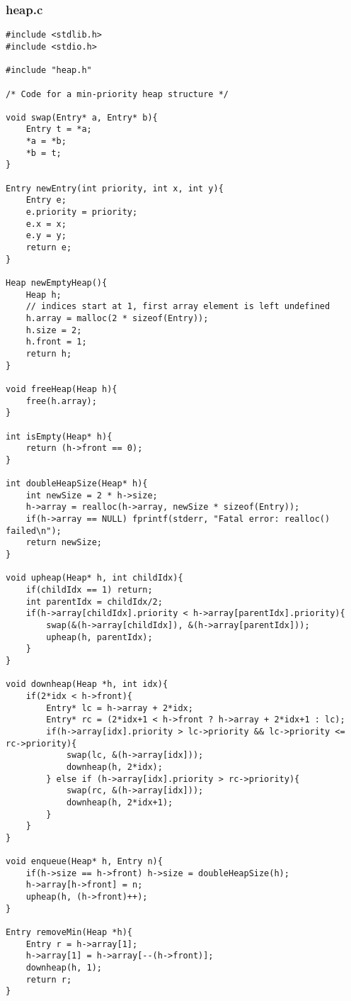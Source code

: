 \documentclass{article}
\begin{document}
\subsubsection*{heap.c}
\begin{lstlisting}
#include <stdlib.h>
#include <stdio.h>

#include "heap.h"

/* Code for a min-priority heap structure */

void swap(Entry* a, Entry* b){
	Entry t = *a;
	*a = *b;
	*b = t;
}

Entry newEntry(int priority, int x, int y){
	Entry e;
	e.priority = priority;
	e.x = x;
	e.y = y;
	return e;
}

Heap newEmptyHeap(){
	Heap h;
	// indices start at 1, first array element is left undefined
	h.array = malloc(2 * sizeof(Entry));
	h.size = 2;
	h.front = 1;
	return h;
}

void freeHeap(Heap h){
	free(h.array);
}

int isEmpty(Heap* h){
	return (h->front == 0);
}

int doubleHeapSize(Heap* h){
	int newSize = 2 * h->size;
	h->array = realloc(h->array, newSize * sizeof(Entry));
	if(h->array == NULL) fprintf(stderr, "Fatal error: realloc() failed\n");
	return newSize;
}

void upheap(Heap* h, int childIdx){
	if(childIdx == 1) return;
	int parentIdx = childIdx/2;
	if(h->array[childIdx].priority < h->array[parentIdx].priority){
		swap(&(h->array[childIdx]), &(h->array[parentIdx]));
		upheap(h, parentIdx);
	}
}

void downheap(Heap *h, int idx){
	if(2*idx < h->front){
		Entry* lc = h->array + 2*idx;
		Entry* rc = (2*idx+1 < h->front ? h->array + 2*idx+1 : lc);
		if(h->array[idx].priority > lc->priority && lc->priority <= rc->priority){
			swap(lc, &(h->array[idx]));
			downheap(h, 2*idx);
		} else if (h->array[idx].priority > rc->priority){
			swap(rc, &(h->array[idx]));
			downheap(h, 2*idx+1);
		}
	}
}

void enqueue(Heap* h, Entry n){
	if(h->size == h->front) h->size = doubleHeapSize(h);
	h->array[h->front] = n;
	upheap(h, (h->front)++);
}

Entry removeMin(Heap *h){
	Entry r = h->array[1];
	h->array[1] = h->array[--(h->front)];
	downheap(h, 1);
	return r;
}
\end{lstlisting}
\end{document}
